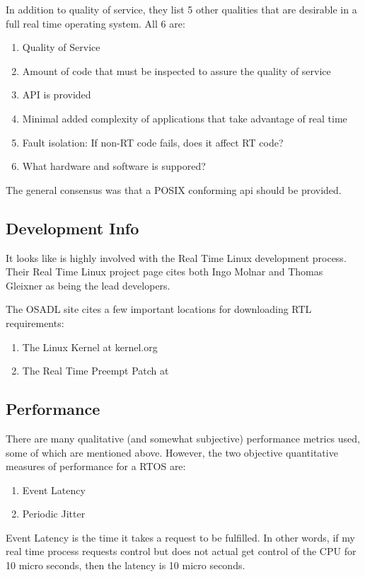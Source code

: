 \documentclass{article}
\begin{document}
In addition to quality of service, they list 5 other qualities that are desirable in a full real time operating system.  All 6 are:
\begin{enumerate}
\item Quality of Service
\item Amount of code that must be inspected to assure the quality of service
\item API is provided
\item Minimal added complexity of applications that take advantage of real time
\item Fault isolation: If non-RT code fails, does it affect RT code?
\item What hardware and software is suppored?
\end{enumerate}

The general consensus was that a POSIX conforming api should be provided.

\subsection{Development Info}
It looks like \cite{Osadl} is highly involved with the Real Time Linux development process.  Their Real Time Linux project page \cite{OsadlRealTimeLinux} cites both Ingo Molnar and Thomas Gleixner as being the lead developers.

The OSADL site cites a few important locations for downloading RTL requirements:
\begin{enumerate}
\item The Linux Kernel at kernel.org
\item The Real Time Preempt Patch at \cite{RealTimeLinuxPatch}
\end{enumerate}

\subsection{Performance}
There are many qualitative (and somewhat subjective) performance metrics used, some of which are mentioned above.  However, the two objective quantitative measures of performance for a RTOS are:
\begin{enumerate}
\item Event Latency
\item Periodic Jitter
\end{enumerate}

Event Latency is the time it takes a request to be fulfilled.  In other words, if my real time process requests control but does not actual get control of the CPU for 10 micro seconds, then the latency is 10 micro seconds.
\end{document}
